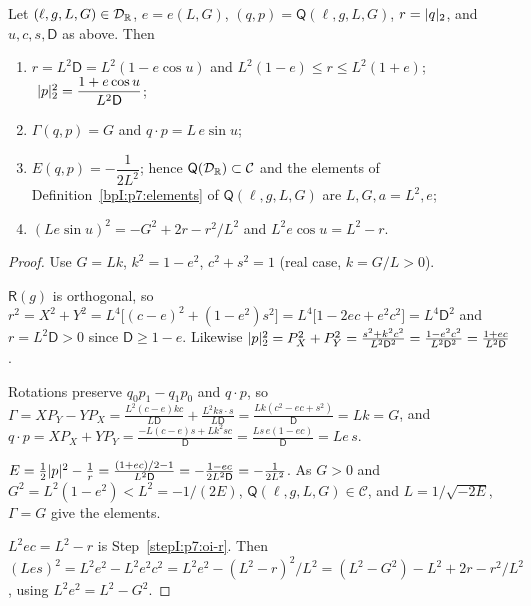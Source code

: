 \begin{proposition}\label{bpI:p7:orbit-identities}
Let $(\ell,g,L,G)\in\mathcal D_{\mathbb{R}}$, $e=e(L,G)$, $(q,p)=\mathsf Q(\ell,g,L,G)$, $r=\lvert q\rvert_2$, and $u,c,s,\mathsf D$ as above. Then
\begin{enumerate}[label=(\alph*)]
\item $r=L^2\mathsf D=L^2(1-e\cos u)$ and $L^2(1-e)\le r\le L^2(1+e)$; $\ \lvert p\rvert_2^2=\dfrac{1+e\cos u}{L^2\mathsf D}$;
\item $\Gamma(q,p)=G$ and $q\cdot p=L\,e\sin u$;
\item $E(q,p)=-\dfrac1{2L^2}$; hence $\mathsf Q(\mathcal D_{\mathbb{R}})\subset\mathcal C$ and the elements of Definition~\ref{bpI:p7:elements} of $\mathsf Q(\ell,g,L,G)$ are $L,G,a=L^2,e$;
\item $(Le\sin u)^2=-G^2+2r-r^2/L^2$ and $L^2e\cos u=L^2-r$.
\end{enumerate}
\end{proposition}
\begin{proof}
Use $G=Lk$, $k^2=1-e^2$, $c^2+s^2=1$ (real case, $k=G/L>0$).

\label{stepI:p7:oi-r} $\mathsf R(g)$ is orthogonal, so $r^2=X^2+Y^2=L^4\bigl[(c-e)^2+(1-e^2)s^2\bigr]=L^4\bigl[1-2ec+e^2c^2\bigr]=L^4\mathsf D^2$ and $r=L^2\mathsf D>0$ since $\mathsf D\ge1-e$.
Likewise $\lvert p\rvert_2^2=P_X^2+P_Y^2=\frac{s^2+k^2c^2}{L^2\mathsf D^2}=\frac{1-e^2c^2}{L^2\mathsf D^2}=\frac{1+ec}{L^2\mathsf D}$.

\label{stepI:p7:oi-gam} Rotations preserve $q_0p_1-q_1p_0$ and $q\cdot p$, so $\Gamma=XP_Y-YP_X=\frac{L^2(c-e)kc}{L\mathsf D}+\frac{L^2ks\cdot s}{L\mathsf D}=\frac{Lk(c^2-ec+s^2)}{\mathsf D}=Lk=G$, and
$q\cdot p=XP_X+YP_Y=\frac{-L(c-e)s+L k^2sc}{\mathsf D}=\frac{Ls\,e(1-ec)}{\mathsf D}=Le\,s$.

\label{stepI:p7:oi-en} $E=\frac12\lvert p\rvert^2-\frac1r=\frac{(1+ec)/2-1}{L^2\mathsf D}=-\frac{1-ec}{2L^2\mathsf D}=-\frac1{2L^2}$. As $G>0$ and $G^2=L^2(1-e^2)<L^2=-1/(2E)$, $\mathsf Q(\ell,g,L,G)\in\mathcal C$, and $L=1/\sqrt{-2E}$, $\Gamma=G$ give the elements.

\label{stepI:p7:oi-d} $L^2ec=L^2-r$ is Step~\ref{stepI:p7:oi-r}. Then $(Les)^2=L^2e^2-L^2e^2c^2=L^2e^2-(L^2-r)^2/L^2=(L^2-G^2)-L^2+2r-r^2/L^2$, using $L^2e^2=L^2-G^2$.
\end{proof}


